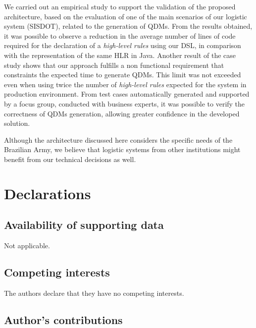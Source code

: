 \documentclass[twocolumn]{bmcart}%
\newcommand{\callers}{\emph{high-level rules}\xspace}
\newcommand{\shc}{HLR\xspace}
\begin{document}
We carried out an empirical study to support the validation of the proposed architecture, based on the evaluation of one of the main scenarios of our logistic system (SISDOT), related to the generation of QDMs. From the results obtained, it was possible to observe a reduction in the average number of lines of code required for the declaration of a \callers using our DSL, in comparison with the representation of the same \shc in Java. Another result of the case study shows that our approach fulfills a non functional requirement that constraints the expected time to generate QDMs. This limit was not exceeded even when using twice the number of \callers expected for the system in production environment. From test cases automatically generated and supported by a focus group, conducted with business experts, it was possible to verify the correctness of QDMs generation, allowing greater confidence in the developed solution.

Although the architecture discussed here considers the specific needs of the Brazilian Army, we believe that logistic systems from other institutions might benefit from our technical decisions as well.







\section{Declarations}

\subsection{Availability of supporting data}

Not applicable.

\subsection{Competing interests}

The authors declare that they have no competing interests.

\subsection{Author's contributions}
\end{document}
